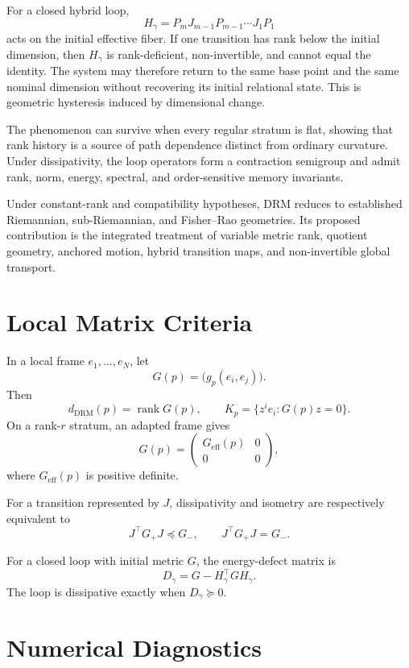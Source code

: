 \documentclass[11pt]{article}
\newcommand{\rank}{\operatorname{rank}}
\begin{document}
For a closed hybrid loop,
\[
H_\gamma=P_mJ_{m-1}P_{m-1}\cdots J_1P_1
\]
acts on the initial effective fiber. If one transition has rank below the
initial dimension, then $H_\gamma$ is rank-deficient, non-invertible, and
cannot equal the identity. The system may therefore return to the same base
point and the same nominal dimension without recovering its initial
relational state. This is geometric hysteresis induced by dimensional change.

The phenomenon can survive when every regular stratum is flat, showing that
rank history is a source of path dependence distinct from ordinary curvature.
Under dissipativity, the loop operators form a contraction semigroup and admit
rank, norm, energy, spectral, and order-sensitive memory invariants.

Under constant-rank and compatibility hypotheses, DRM reduces to established
Riemannian, sub-Riemannian, and Fisher--Rao geometries. Its proposed
contribution is the integrated treatment of variable metric rank, quotient
geometry, anchored motion, hybrid transition maps, and non-invertible global
transport.

\appendix

\section{Local Matrix Criteria}

In a local frame $e_1,\ldots,e_N$, let
\[
G(p)=\bigl(g_p(e_i,e_j)\bigr).
\]
Then
\[
d_{\mathrm{DRM}}(p)=\rank G(p),
\qquad
K_p=\{z^ie_i:G(p)z=0\}.
\]
On a rank-$r$ stratum, an adapted frame gives
\[
G(p)=\begin{pmatrix}G_{\mathrm{eff}}(p)&0\\0&0\end{pmatrix},
\]
where $G_{\mathrm{eff}}(p)$ is positive definite.

For a transition represented by $J$, dissipativity and isometry are
respectively equivalent to
\[
J^\top G_+J\preceq G_-,
\qquad
J^\top G_+J=G_-.
\]

For a closed loop with initial metric $G$, the energy-defect matrix is
\[
D_\gamma=G-H_\gamma^\top G H_\gamma.
\]
The loop is dissipative exactly when $D_\gamma\succeq0$.

\section{Numerical Diagnostics}
\end{document}

